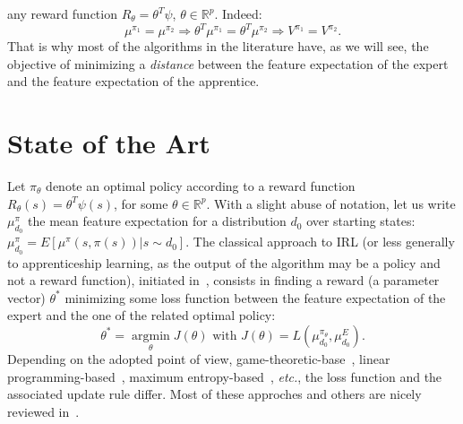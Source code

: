 \documentclass{article}
\newcommand{\argmin}{\operatorname*{argmin}}
\begin{document}
any reward function $R_\theta=\theta^T\psi$,
$\theta\in\mathbb{R}^p$. Indeed:
%
\begin{equation}  \mu^{\pi_1} = \mu^{\pi_2} \Rightarrow
\theta^T\mu^{\pi_1} = \theta^T\mu^{\pi_2} \Rightarrow V^{\pi_1} =
V^{\pi_2}. \label{memevaleur.eqn}
\end{equation}
%
%
That is why most of the algorithms in the literature have, as we
will see, the objective of minimizing a \textit{distance}  between
the feature expectation of the expert and the feature expectation of
the apprentice. %

\section{State of the Art}
\label{biblio.sec}

Let $\pi_\theta$ denote an optimal policy according to a reward
function $R_\theta(s)=\theta^T\psi(s)$, for some
$\theta\in\mathbb{R}^p$. With a slight abuse of notation, let us
write $\mu^\pi_{d_0}$ the mean feature expectation for a
distribution $d_0$ over starting states:
$\mu^\pi_{d_0}=E[\mu^\pi(s,\pi(s))|s\sim d_0]$. The classical
approach to IRL (or less generally to apprenticeship learning, as
the output of the algorithm may be a policy and not a reward
function), initiated in~\cite{abbeel2004apprenticeship}, consists in
finding a reward (a parameter vector) $\theta^*$ minimizing some
loss function between the feature expectation of the expert and the
one of the related optimal policy:
\begin{equation}
  \theta^* = \argmin_\theta J(\theta) \text{ with } J(\theta)=
  L(\mu^{\pi_\theta}_{d_0},\mu^E_{d_0}).\nonumber
\end{equation}
Depending on the adopted point of view,
game-theoretic-base~\cite{syed2008game}, linear
programming-based~\cite{syed2008apprenticeship}, maximum
entropy-based~\cite{ziebart2008maximum}, \textit{etc.}, the loss
function and the associated update rule differ. Most of these
approches and others are nicely reviewed in~\cite{neu2009training}.
\end{document}
